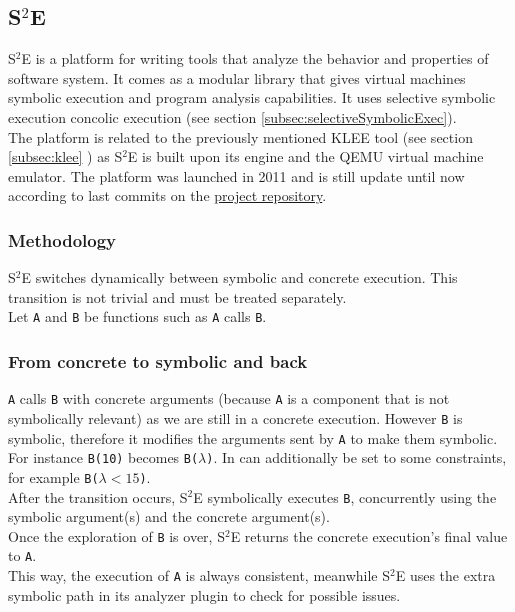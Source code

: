 \documentclass[11pt]{IEEEtran}
\begin{document}
	\subsection{S$^2$E}
    \label{subsec:S2E}
    	S$^2$E is a platform for writing tools that analyze the behavior and properties of software system. It comes as a modular library that gives virtual machines symbolic execution and program analysis capabilities.\cite{S2EWebSite} It uses selective symbolic execution concolic execution (see section  \ref{subsec:selectiveSymbolicExec}).\\

		The platform is related to the previously mentioned KLEE tool (see section \ref{subsec:klee} ) as S$^2$E is built upon its engine and the QEMU virtual machine emulator.
    	The platform was launched in 2011 and is still update until now according to last commits on the \href{https://github.com/S2E}{project repository}.

    	\subsubsection{Methodology}
    		S$^2$E switches dynamically between symbolic and concrete execution. This transition is not trivial and must be treated separately.\\
    		Let \texttt{A} and \texttt{B} be functions such as \texttt{A} calls \texttt{B}.\\
    		\subsubsection*{From concrete to symbolic and back}
    			\texttt{A} calls \texttt{B} with concrete arguments (because \texttt{A} is a component that is not symbolically relevant) as we are still in a concrete execution. However \texttt{B} is symbolic, therefore it modifies the arguments sent by \texttt{A} to make them symbolic. For instance \texttt{B(10)} becomes \texttt{B($\lambda$)}. In can additionally be set to some constraints, for example \texttt{B($\lambda < 15$)}.\\
    			After the transition occurs, S$^2$E symbolically executes \texttt{B}, concurrently using the symbolic argument(s) and the concrete argument(s).\\
    			Once the exploration of \texttt{B} is over, S$^2$E returns the concrete execution's final value to \texttt{A}.\\
    			This way, the execution of \texttt{A} is always consistent, meanwhile S$^2$E uses the extra symbolic path in its analyzer plugin to check for possible issues.
\end{document}

